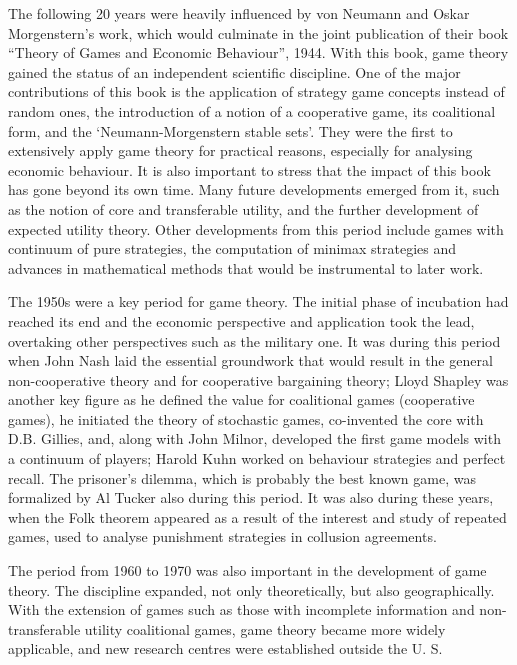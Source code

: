 The following 20 years were heavily influenced by von Neumann and Oskar Morgenstern’s work, which would culminate in the joint publication of their book “Theory of Games and Economic Behaviour”, 1944.  With this book, game theory gained the status of an independent scientific discipline. One of the major contributions of this book is the application of strategy game concepts instead of random ones, the introduction of a notion of a cooperative game, its coalitional form, and the ‘Neumann-Morgenstern stable sets’. They were the first to extensively apply game theory for practical reasons, especially for analysing economic behaviour. It is also important to stress that the impact of this book has gone beyond its own time.  Many future developments emerged from it, such as the notion of core and transferable utility, and the further development of expected utility theory. Other developments from this period include games with continuum of pure strategies, the computation of minimax strategies and advances in mathematical methods that would be instrumental to later work.

The 1950s were a key period for game theory. The initial phase of incubation had reached its end and the economic perspective and application took the lead, overtaking other perspectives such as the military one. It was during this period when John Nash laid the essential groundwork that would result in the general non-cooperative theory and for cooperative bargaining theory; Lloyd Shapley was another key figure as he defined the value for coalitional games (cooperative games), he initiated the theory of stochastic games, co-invented the core with D.B. Gillies, and, along with John Milnor, developed the first game models with a continuum of players; Harold Kuhn worked on behaviour strategies and perfect recall. The prisoner’s dilemma, which is probably the best known game, was formalized by Al Tucker also during this period. It was also during these years, when the Folk theorem appeared as a result of the interest and study of repeated games, used to analyse punishment strategies in collusion agreements.

The period from 1960 to 1970 was also important in the development of game theory. The discipline expanded, not only theoretically, but also geographically. With the extension of games such as those with incomplete information and non-transferable utility coalitional games, game theory became more widely applicable, and new research centres were established outside the U. S.

